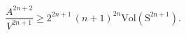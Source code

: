 \begin{equation}
\frac{A^{2n+2}}{V^{2n+1}} \ge 2^{2n+1}\,(n+1)^{2n}
{\mathrm{Vol({S^{2n+1}})}}\label{Eguhidim1}.
\end{equation}

